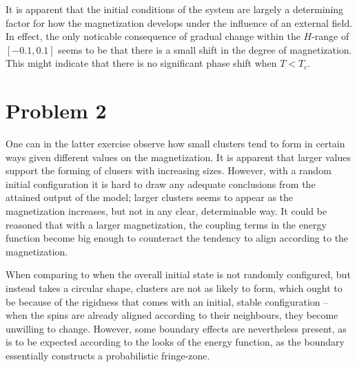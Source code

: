 \documentclass[a4paper,12pt]{article}
\theoremstyle{plain}
\theoremstyle{definition}
\begin{document}
      It is apparent that the initial conditions of the system are largely a
      determining factor for how the magnetization develops under the influence
      of an external field. In effect, the only noticable consequence of gradual
      change within the $H$-range
      of $[-0.1, 0.1]$ seems to be that there is a small shift in the degree of
      magnetization. This might indicate that there is no significant phase
      shift when $T<T_c$.

    \section{Problem 2}

      One can in the latter exercise observe how small clusters tend to form in
      certain ways given different values on the magnetization. It is apparent
      that larger values support the forming of clusers with increasing sizes.
      However, with a random initial configuration it is hard to draw any
      adequate conclusions from the attained output of the model; larger 
      clusters seems to appear as the magnetization
      increases, but not in any clear, determinable way. It could be reasoned
      that with a larger magnetization, the coupling terms in the energy
      function become big enough to counteract the tendency to align according
      to the magnetization. 

      When comparing to when the overall initial state is not randomly
      configured, but instead takes a circular shape, clusters are not as likely
      to form, which ought to be because of the rigidness that comes with an
      initial, stable configuration -- when the spins are already aligned
      according to their neighbours, they become unwilling to change. 
      However, some boundary effects are nevertheless present, as is to be
      expected according to the looks of the energy function, as the boundary
      essentially constructs a probabilistic fringe-zone. 
   
\end{document}

